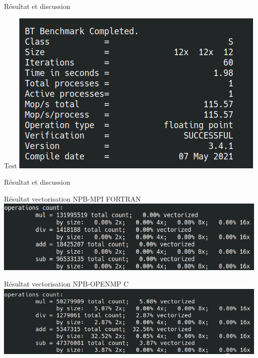 \documentclass{beamer}
\begin{document}
\begin{frame}{Résultat et discussion}

  \begin{block}{Test}
    \includegraphics[width=0.6\linewidth]{../ressources/btcompleted.png}
  \end{block}

\end{frame}

\begin{frame}{Résultat et discussion}

  \begin{block}{Résultat vectorisation NPB-MPI FORTRAN}
    \includegraphics[width=0.6\linewidth]{../ressources/vect1.png}
  \end{block}
  
  \begin{block}{Résultat vectorisation NPB-OPENMP C}
    \includegraphics[width=0.6\linewidth]{../ressources/vcopenmp.png}
  \end{block}

\end{frame}
\end{document}
